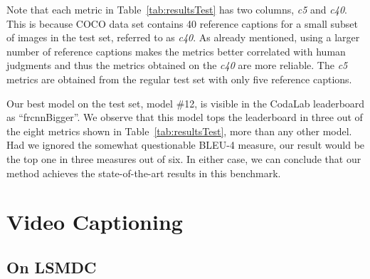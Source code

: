 Note that each metric in Table~\ref{tab:resultsTest} has two columns, \emph{c5}
and \emph{c40}. 
This is because COCO data set contains 40 reference captions for a small subset
of images in the test set, referred to as \emph{c40}. 
As already mentioned, using a larger number of reference captions makes the
metrics better correlated with human judgments and thus the metrics obtained on
the \emph{c40} are more reliable.
The \emph{c5} metrics are obtained from the regular test set with only five
reference captions. 

Our best model on the test set, model \#12, is visible in the CodaLab
leaderboard as ``frcnnBigger''.  
We observe that this model tops the leaderboard in three out of the eight
metrics shown in Table~\ref{tab:resultsTest}, more than any other model.
Had we ignored the somewhat questionable BLEU-4 measure, our result would be the
top one in three measures out of six.
In either case, we can conclude that our method achieves the state-of-the-art
results in this benchmark.


\section{Video Captioning}
\subsection{On LSMDC}

